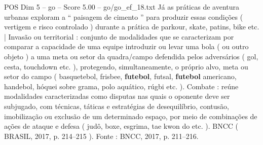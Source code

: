 \begin{textsample}{POS Dim 5 – go – Score 5.00 – go/go\_ef\_18.txt}
Já as práticas de aventura urbanas exploram a “ paisagem de cimento ” para produzir essas condições ( vertigem e risco controlado ) durante a prática de parkour, skate, patins, bike etc. | Invasão ou territorial : conjunto de modalidades que se caracterizam por comparar a capacidade de uma equipe introduzir ou levar uma bola ( ou outro objeto ) a uma meta ou setor da quadra/campo defendida pelos adversários ( gol, cesta, touchdown etc. ), protegendo, simultaneamente, o próprio alvo, meta ou setor do campo ( basquetebol, frisbee, \textbf{futebol}, futsal, \textbf{futebol} americano, handebol, hóquei sobre grama, polo aquático, rúgbi etc. ).
Combate : reúne modalidades caracterizadas como disputas nas quais o oponente deve ser subjugado, com técnicas, táticas e estratégias de desequilíbrio, contusão, imobilização ou exclusão de um determinado espaço, por meio de combinações de ações de ataque e defesa ( judô, boxe, esgrima, tae kwon do etc. ).
BNCC ( BRASIL, 2017, p. 214–215 ).
Fonte : BNCC, 2017, p. 211–216.

\end{textsample}
